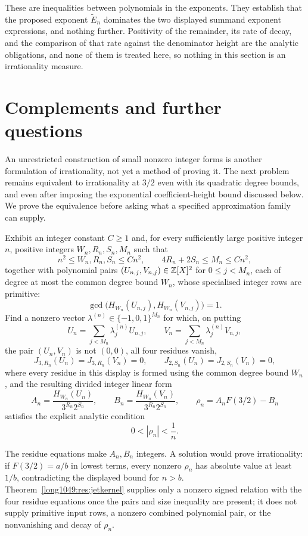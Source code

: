 \documentclass[11pt]{article}
\begin{document}
These are inequalities between polynomials in the exponents. They
establish that the proposed exponent $\widetilde{E}_n$ dominates the two
displayed summand exponent expressions, and nothing further.  Positivity of the remainder, its rate of
decay, and the comparison of that rate against the denominator height are the
analytic obligations, and none of them is treated here, so nothing in this
section is an irrationality measure.

\section{Complements and further questions}\label{long1049:sec:open}

An unrestricted construction of small nonzero integer forms is
another formulation of irrationality, not yet a method of proving
it. The next problem remains equivalent to irrationality at $3/2$
even with its quadratic degree bounds, and even after imposing
the exponential coefficient-height bound discussed below.
We prove the equivalence before asking what a specified
approximation family can supply.

\begin{problem}\label{long1049:prob:kernel}
Exhibit an integer constant \(C\ge1\) and, for every sufficiently large
positive integer \(n\), positive integers \(W_n,R_n,S_n,M_n\) such that
\[
 n^2\le W_n,R_n,S_n\le Cn^2,
 \qquad 4R_n+2S_n\le M_n\le Cn^2,
\]
together with polynomial pairs
\((U_{n,j},V_{n,j})\in\mathbb{Z}[X]^2\) for \(0\le j<M_n\), each of degree at most
the common degree bound \(W_n\), whose specialised integer rows are
primitive:
\[
 \gcd\!\bigl(H_{W_n}(U_{n,j}),H_{W_n}(V_{n,j})\bigr)=1.
\]
Find a nonzero vector
\(\lambda^{(n)}\in\{-1,0,1\}^{M_n}\) for which, on putting
\[
 U_n=\sum_{j<M_n}\lambda^{(n)}_jU_{n,j},
 \qquad V_n=\sum_{j<M_n}\lambda^{(n)}_jV_{n,j},
\]
the pair \((U_n,V_n)\) is not \((0,0)\), all four residues vanish,
\[
 J_{3,R_n}(U_n)=J_{3,R_n}(V_n)=0,
 \qquad J_{2,S_n}(U_n)=J_{2,S_n}(V_n)=0,
\]
where every residue in this display is formed using the common degree bound \(W_n\),
and the resulting divided integer linear form
\[
 A_n=\frac{H_{W_n}(U_n)}{3^{R_n}2^{S_n}},
 \qquad
 B_n=\frac{H_{W_n}(V_n)}{3^{R_n}2^{S_n}},
 \qquad
 \rho_n=A_nF(3/2)-B_n
\]
satisfies the explicit analytic condition
\[
 0<|\rho_n|<\frac1n.
\]
\end{problem}

The residue equations make \(A_n,B_n\) integers.  A solution would prove
irrationality: if \(F(3/2)=a/b\) in lowest terms, every nonzero \(\rho_n\) has
absolute value at least \(1/b\), contradicting the displayed bound for
\(n>b\).  Theorem~\ref{long1049:res:jetkernel} supplies only a nonzero signed relation
with the four residue equations once the pairs and size inequality are present; it
does not supply primitive input rows, a nonzero combined polynomial pair, or
the nonvanishing and decay of \(\rho_n\).
\end{document}
